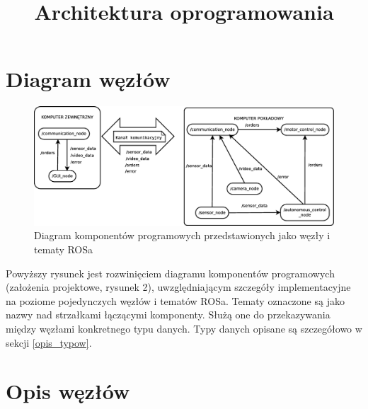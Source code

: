 \documentclass[a4paper]{article}
\title{Architektura oprogramowania}
\date{}
\author{}
\begin{document}
\maketitle

\section{Diagram węzłów}

\begin{figure}[H]
\centering
\includegraphics[width=16cm]{architektura}
\caption{Diagram komponentów programowych przedstawionych jako węzły i tematy ROSa}
\end{figure}

Powyższy rysunek jest rozwinięciem diagramu komponentów programowych (założenia projektowe, rysunek 2), uwzględniającym szczegóły implementacyjne na poziome pojedynczych węzłów i tematów ROSa. Tematy oznaczone są jako nazwy nad strzałkami łączącymi komponenty. Służą one do przekazywania między węzłami konkretnego typu danych. Typy danych opisane są szczegółowo w sekcji \ref{opis_typow}.

\section{Opis węzłów}
\end{document}
